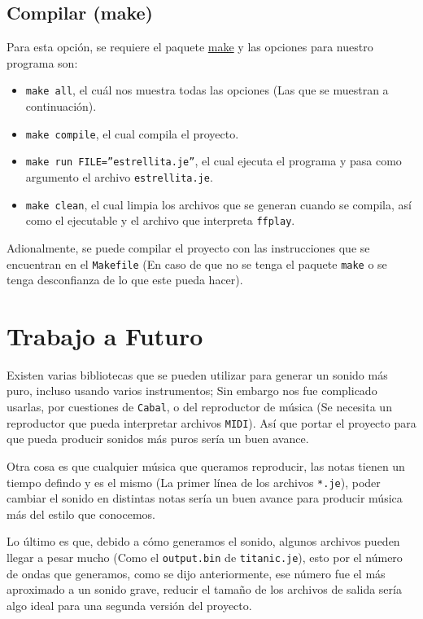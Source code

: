 \documentclass[10pt,a4paper]{article}
\begin{document}
\subsection{Compilar (make)}
Para esta opción, se requiere el paquete
\href{https://www.archlinux.org/packages/core/x86\_64/make/}{make} y las opciones
para nuestro programa son:

\begin{itemize}
\item \texttt{make all}, el cuál nos muestra todas las opciones (Las que se
  muestran a continuación).
\item \texttt{make compile}, el cual compila el proyecto.
\item \texttt{make run FILE=''estrellita.je''}, el cual ejecuta el programa y pasa
  como argumento el archivo \texttt{estrellita.je}.
\item \texttt{make clean}, el cual limpia los archivos que se generan cuando se
  compila, así como el ejecutable y el archivo que interpreta \texttt{ffplay}.
\end{itemize}

Adionalmente, se puede compilar el proyecto con las instrucciones que se
encuentran en el \texttt{Makefile} (En caso de que no se tenga el paquete
\texttt{make} o se tenga desconfianza de lo que este pueda hacer).

\section{Trabajo a Futuro}
\label{sec:TaF}
Existen varias bibliotecas\cite{paul} que se pueden utilizar para generar un
sonido más puro, incluso usando varios instrumentos; Sin embargo nos fue
complicado usarlas, por cuestiones de \texttt{Cabal}, o del reproductor de música
(Se necesita un reproductor que pueda interpretar archivos \texttt{MIDI}). Así
que portar el proyecto para que pueda producir sonidos más puros sería un buen
avance.

Otra cosa es que cualquier música que queramos reproducir, las notas tienen un
tiempo defindo y es el mismo (La primer línea de los archivos \texttt{*.je}),
poder cambiar el sonido en distintas notas sería un buen avance para producir
música más del estilo que conocemos.

Lo último es que, debido a cómo generamos el sonido, algunos archivos pueden
llegar a pesar mucho (Como el \texttt{output.bin} de \texttt{titanic.je}), esto
por el número de ondas que generamos, como se dijo anteriormente, ese número fue
el más aproximado a un sonido grave, reducir el tamaño de los archivos de salida
sería algo ideal para una segunda versión del proyecto.
\end{document}
